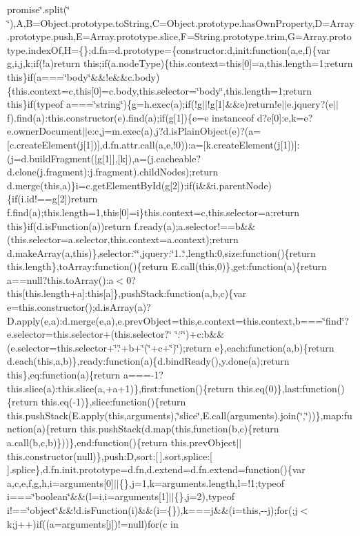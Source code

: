 \begin{DoxyCompactItemize}
promise\char`\"{}.\-split(\char`\"{} \char`\"{}),\-A,\-B=\-Object.\-prototype.\-to\-String,\-C=\-Object.\-prototype.\-has\-Own\-Property,\-D=\-Array.\-prototype.\-push,\-E=\-Array.\-prototype.\-slice,\-F=\-String.\-prototype.\-trim,\-G=\-Array.\-prototype.\-index\-Of,\-H=\{\};d.\-fn=d.\-prototype=\{constructor\-:d,init\-:function(a,e,f)\{var g,i,j,k;if(!a)return this;if(a.\-node\-Type)\{this.\-context=this[0]=a,this.\-length=1;return this\}if(a===\char`\"{}body\char`\"{}\&\&!e\&\&c.\-body)\{this.\-context=c,this[0]=c.\-body,this.\-selector=\char`\"{}body\char`\"{},this.\-length=1;return this\}if(typeof a===\char`\"{}string\char`\"{})\{g=h.\-exec(a);if(!g$|$$|$!g[1]\&\&e)return!e$|$$|$e.\-jquery?(e$|$$|$f).\-find(a)\-:this.\-constructor(e).\-find(a);if(g[1])\{e=e instanceof d?e[0]\-:e,k=e?e.\-owner\-Document$|$$|$e\-:c,j=m.\-exec(a),j?d.\-is\-Plain\-Object(e)?(a=[c.\-create\-Element(j[1])],d.\-fn.\-attr.\-call(a,e,!0))\-:a=[k.\-create\-Element(j[1])]\-:(j=d.\-build\-Fragment([g[1]],[k]),a=(j.\-cacheable?d.\-clone(j.\-fragment)\-:j.\-fragment).\-child\-Nodes);return d.\-merge(this,a)\}i=c.\-get\-Element\-By\-Id(g[2]);if(i\&\&i.\-parent\-Node)\{if(i.\-id!==g[2])return f.\-find(a);this.\-length=1,this[0]=i\}this.\-context=c,this.\-selector=a;return this\}if(d.\-is\-Function(a))return f.\-ready(a);a.\-selector!==b\&\&(this.\-selector=a.\-selector,this.\-context=a.\-context);return d.\-make\-Array(a,this)\},selector\-:\char`\"{}\char`\"{},jquery\-:\char`\"{}1..\char`\"{},length\-:0,size\-:function()\{return this.\-length\},to\-Array\-:function()\{return E.\-call(this,0)\},get\-:function(a)\{return a==null?this.\-to\-Array()\-:a$<$0?this[this.\-length+a]\-:this[a]\},push\-Stack\-:function(a,b,c)\{var e=this.\-constructor();d.\-is\-Array(a)?\-D.\-apply(e,a)\-:d.\-merge(e,a),e.\-prev\-Object=this,e.\-context=this.\-context,b===\char`\"{}find\char`\"{}?e.\-selector=this.\-selector+(this.\-selector?\char`\"{} \char`\"{}\-:\char`\"{}\char`\"{})+c\-:b\&\&(e.\-selector=this.\-selector+\char`\"{}.\char`\"{}+b+\char`\"{}(\char`\"{}+c+\char`\"{})\char`\"{});return e\},each\-:function(a,b)\{return d.\-each(this,a,b)\},ready\-:function(a)\{d.\-bind\-Ready(),y.\-done(a);return this\},eq\-:function(a)\{return a===-\/1?this.\-slice(a)\-:this.\-slice(a,+a+1)\},first\-:function()\{return this.\-eq(0)\},last\-:function()\{return this.\-eq(-\/1)\},slice\-:function()\{return this.\-push\-Stack(\-E.\-apply(this,arguments),\char`\"{}slice\char`\"{},\-E.\-call(arguments).\-join(\char`\"{},\char`\"{}))\},map\-:function(a)\{return this.\-push\-Stack(d.\-map(this,function(b,c)\{return a.\-call(b,c,b)\}))\},end\-:function()\{return this.\-prev\-Object$|$$|$this.\-constructor(null)\},push\-:\-D,sort\-:[$\,$].\-sort,splice\-:[$\,$].\-splice\},d.\-fn.\-init.\-prototype=d.\-fn,d.\-extend=d.\-fn.\-extend=function()\{var a,c,e,f,g,h,i=arguments[0]$|$$|$\{\},j=1,k=arguments.\-length,l=!1;typeof i===\char`\"{}boolean\char`\"{}\&\&(l=i,i=arguments[1]$|$$|$\{\},j=2),typeof i!==\char`\"{}object\char`\"{}\&\&!d.\-is\-Function(i)\&\&(i=\{\}),k===j\&\&(i=this,-\/-\/j);for(;j$<$k;j++)if((a=arguments[j])!=null)for(c in 
\end{DoxyCompactItemize}
